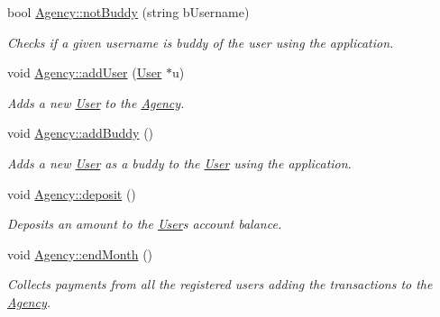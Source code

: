 \begin{DoxyCompactItemize}
bool \hyperlink{group___agency_ga9cbd4d4f5f20f6ec9e3d3088cf61f96a}{Agency\+::not\+Buddy} (string b\+Username)
\begin{DoxyCompactList}\small\item\em Checks if a given username is buddy of the user using the application. \end{DoxyCompactList}\item 
void \hyperlink{group___agency_ga9307d4ce4dd311f5744592248be6c9e5}{Agency\+::add\+User} (\hyperlink{class_user}{User} $\ast$u)
\begin{DoxyCompactList}\small\item\em Adds a new \hyperlink{class_user}{User} to the \hyperlink{class_agency}{Agency}. \end{DoxyCompactList}\item 
\mbox{\label{group___agency_ga56bbae6923a8e9414085ffb23e644d53}} 
void \hyperlink{group___agency_ga56bbae6923a8e9414085ffb23e644d53}{Agency\+::add\+Buddy} ()
\begin{DoxyCompactList}\small\item\em Adds a new \hyperlink{class_user}{User} as a buddy to the \hyperlink{class_user}{User} using the application. \end{DoxyCompactList}\item 
\mbox{\label{group___agency_gaa76bfa288699a10c82a04db205bc56d6}} 
void \hyperlink{group___agency_gaa76bfa288699a10c82a04db205bc56d6}{Agency\+::deposit} ()
\begin{DoxyCompactList}\small\item\em Deposits an amount to the \hyperlink{class_user}{User}\textquotesingle{}s account balance. \end{DoxyCompactList}\item 
\mbox{\label{group___agency_ga69f9b0bc4960edabb2c3342586069da2}} 
void \hyperlink{group___agency_ga69f9b0bc4960edabb2c3342586069da2}{Agency\+::end\+Month} ()
\begin{DoxyCompactList}\small\item\em Collects payments from all the registered users adding the transactions to the \hyperlink{class_agency}{Agency}. \end{DoxyCompactList}\item 
\mbox{\label{group___agency_gaf0d57adbab935cd35d4e49f29e4abc0c}} 

\end{DoxyCompactItemize}
